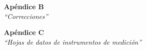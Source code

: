 \documentclass{article}
\begin{document}

\newpage
\vspace*{4cm}
\begin{center}
	\textbf{\Huge{Apéndice B}} \\
	\bigskip\bigskip
	\Large{\textit{``Correcciones''}}
\end{center}







\newpage
\vspace*{4cm}
\begin{center}
	\textbf{\Huge{Apéndice C}} \\
	\bigskip\bigskip
	\Large{\textit{``Hojas de datos de instrumentos de medición''}}
\end{center}
\end{document}
